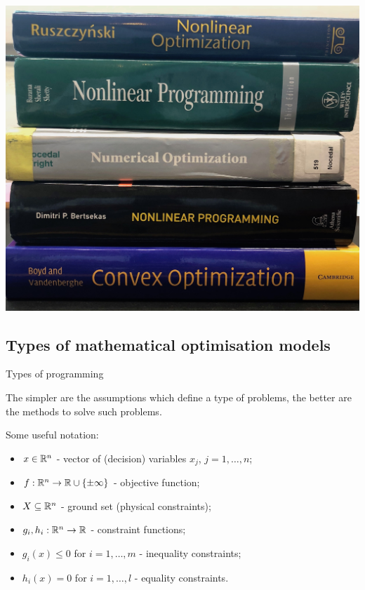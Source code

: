 \begin{frame}
	\centering
	\includegraphics[scale=0.09]{Figures/Books.jpg}

\end{frame}


\subsection{Types of mathematical optimisation models}


	\begin{frame}{Types of programming}
	
	The \alert{simpler are the assumptions} which define a type of problems, the better are the \alert{methods to solve such problems}.
	
	\pause
	
	Some useful notation:
	
	\begin{itemize}[<+->]
		\item $x \in \mathbb R^n$ - vector of (decision) variables $x_j$, $j = 1,\dots, n$;
		\item $f:\mathbb R^n \rightarrow \mathbb R \cup \left\{ \pm \infty \right \}$ - objective function;
		\item $X \subseteq \mathbb R^n$ - ground set (physical constraints);
		\item $g_i, h_i : \mathbb R^n \rightarrow \mathbb R$ - constraint functions; 
		\item $g_i(x) \leq 0$ for $i = 1, \dots, m$ - inequality constraints;
		\item $h_i(x) = 0$ for $i = 1, \dots, l$ - equality constraints.
	\end{itemize}

\end{frame}


